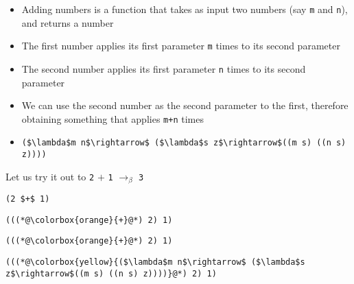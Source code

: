 \documentclass{beamer}
\begin{document}
\begin{frame}[fragile]{\CurrentSection}
\begin{block}{\CurrentSubSection}
\begin{itemize}
\item Adding numbers is a function that takes as input two numbers (say \texttt{m} and \texttt{n}), and returns a number
\item The first number applies its first parameter \texttt{m} times to its second parameter
\item The second number applies its first parameter \texttt{n} times to its second parameter
\item We can use the second number as the second parameter to the first, therefore obtaining something that applies \texttt{m+n} times
\item \lstset{basicstyle=\ttfamily\small}\lstset{numbers=none}\lstset{language=ML}\begin{lstlisting}
($\lambda$m n$\rightarrow$ ($\lambda$s z$\rightarrow$((m s) ((n s) z))))
\end{lstlisting}


\end{itemize}

\end{block}


\end{frame}

\begin{frame}[fragile]{\CurrentSection}
\begin{block}{\CurrentSubSection}
Let us try it out to \texttt{2} $+$ \texttt{1} $\rightarrow_\beta$ \texttt{3}
\end{block}


\end{frame}

\begin{frame}[fragile]{\CurrentSection}
\lstset{basicstyle=\ttfamily\small}\lstset{numbers=none}\lstset{language=ML}\begin{lstlisting}
(2 $+$ 1)
\end{lstlisting}
\pause\lstset{language=ML}\begin{lstlisting}
(((*@\colorbox{orange}{+}@*) 2) 1)
\end{lstlisting}

\end{frame}

\begin{frame}[fragile]{\CurrentSection}
\lstset{basicstyle=\ttfamily\small}\lstset{numbers=none}\lstset{language=ML}\begin{lstlisting}
(((*@\colorbox{orange}{+}@*) 2) 1)
\end{lstlisting}
\pause\lstset{language=ML}\begin{lstlisting}
(((*@\colorbox{yellow}{($\lambda$m n$\rightarrow$ ($\lambda$s z$\rightarrow$((m s) ((n s) z))))}@*) 2) 1)
\end{lstlisting}

\end{frame}
\end{document}
